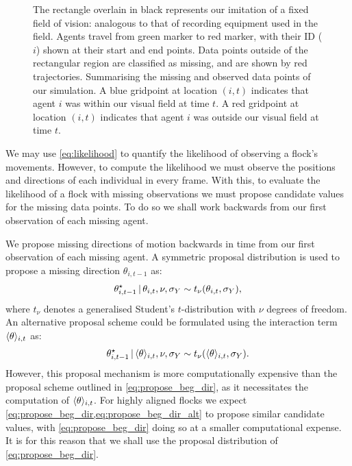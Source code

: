 \begin{figure}[tbp]
{    The rectangle overlain in black represents our imitation of a fixed
    field of vision: analogous to that of recording equipment used in the
    field. Agents travel from green marker to red marker, with their ID ($i$)
    shown at their start and end points. Data points outside of the rectangular
    region are classified as missing, and are shown by red trajectories.
     Summarising the missing and observed data
    points of our simulation. A blue gridpoint at location $(i, t)$ indicates
    that agent $i$ was within our visual field at time $t$. A red gridpoint at
    location $(i, t)$ indicates that agent $i$ was outside our visual field
    at time $t$.}
  \label{fig:beg_data}
\end{figure}

We may use \cref{eq:likelihood} to quantify the likelihood of observing a
flock's movements. However, to compute the likelihood we must observe the
positions and directions of each individual in every frame. With this, to
evaluate the likelihood of a flock with missing observations we must propose
candidate values for the missing data points. To do so we shall work backwards
from our first observation of each missing agent.

We propose missing directions of motion backwards in time from our first
observation of each missing agent. A symmetric proposal distribution is used
to propose a missing direction $\theta_{i,t-1}$ as:
\begin{equation}
  \label{eq:propose_beg_dir}
  \theta_{i,t-1}^{\star} \,|\,  \theta_{i,t}, \nu, \sigma_Y
    \sim t_{\nu}(\theta_{i,t}, \sigma_Y),
\end{equation}
where $t_{\nu}$ denotes a generalised Student's $t$-distribution with $\nu$
degrees of freedom. An alternative proposal scheme could be formulated using
the interaction term $\langle\theta\rangle_{i,t}$ as:
\begin{equation}
  \label{eq:propose_beg_dir_alt}
  \theta_{i,t-1}^{\star} \,|\, \langle\theta\rangle_{i,t}, \nu, \sigma_Y
    \sim t_{\nu}(\langle\theta\rangle_{i,t}, \sigma_Y).
\end{equation}
However, this proposal mechanism is more computationally expensive than the
proposal scheme outlined in \cref{eq:propose_beg_dir}, as it necessitates the
computation of $\langle\theta\rangle_{i,t}$. For highly aligned flocks we expect
\cref{eq:propose_beg_dir,eq:propose_beg_dir_alt} to propose similar candidate
values, with \cref{eq:propose_beg_dir} doing so at a smaller computational
expense. It is for this reason that we shall use the proposal distribution of
\cref{eq:propose_beg_dir}.

